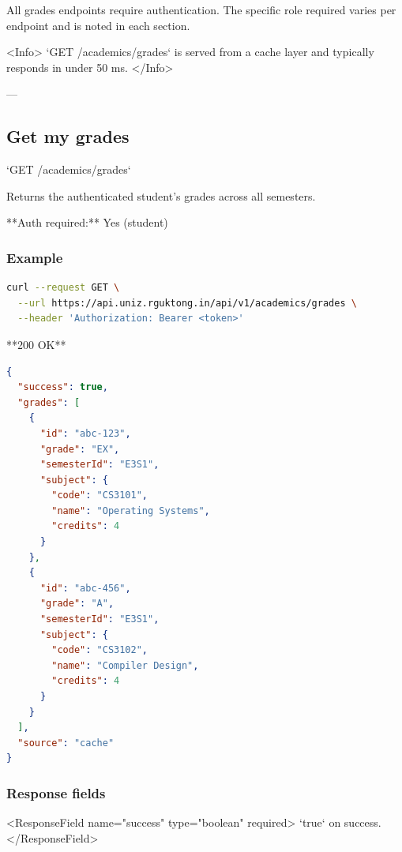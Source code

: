 


All grades endpoints require authentication. The specific role required varies per endpoint and is noted in each section.

<Info>
  `GET /academics/grades` is served from a cache layer and typically responds in
  under 50 ms.
</Info>

---

\subsection{Get my grades}

`GET /academics/grades`

Returns the authenticated student's grades across all semesters.

**Auth required:** Yes (student)

\subsubsection{Example}

\begin{lstlisting}[language=bash]
curl --request GET \
  --url https://api.uniz.rguktong.in/api/v1/academics/grades \
  --header 'Authorization: Bearer <token>'

\end{lstlisting}

**200 OK**

\begin{lstlisting}[language=json]
{
  "success": true,
  "grades": [
    {
      "id": "abc-123",
      "grade": "EX",
      "semesterId": "E3S1",
      "subject": {
        "code": "CS3101",
        "name": "Operating Systems",
        "credits": 4
      }
    },
    {
      "id": "abc-456",
      "grade": "A",
      "semesterId": "E3S1",
      "subject": {
        "code": "CS3102",
        "name": "Compiler Design",
        "credits": 4
      }
    }
  ],
  "source": "cache"
}

\end{lstlisting}

\subsubsection{Response fields}

<ResponseField name="success" type="boolean" required>
  `true` on success.
</ResponseField>

